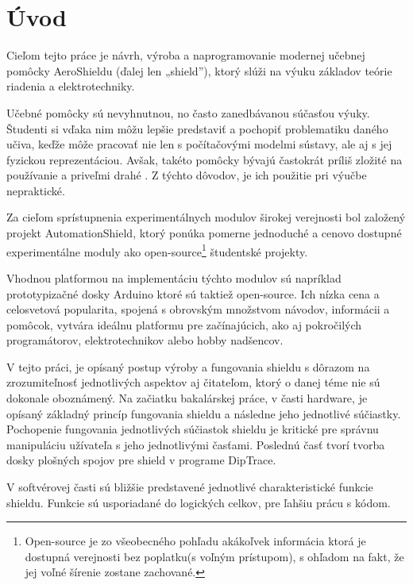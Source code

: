 \chapter*{Úvod}
\label{UVOD}



Cieľom tejto práce je návrh, výroba a naprogramovanie modernej učebnej pomôcky AeroShieldu (ďalej len „shield”), ktorý slúži na výuku základov teórie riadenia a elektrotechniky.

Učebné pomôcky sú nevyhnutnou, no často zanedbávanou súčasťou výuky. Študenti si vďaka nim môžu lepšie predstaviť a pochopiť problematiku daného učiva, keďže môže pracovať nie len s počítačovými modelmi sústavy, ale aj s jej fyzickou reprezentáciou. 
Avšak, takéto pomôcky bývajú častokrát príliš zložité na používanie a priveľmi drahé \cite{Hor}. Z týchto dôvodov, je ich použitie pri výučbe nepraktické.

Za cieľom sprístupnenia experimentálnych modulov širokej verejnosti bol založený projekt AutomationShield, ktorý ponúka pomerne jednoduché a cenovo dostupné experimentálne moduly ako open-source\footnote[1]{Open-source je zo všeobecného pohľadu akákoľvek informácia ktorá je dostupná verejnosti bez poplatku(s voľným prístupom), s ohľadom na fakt, že jej voľné šírenie zostane zachované.} študentské projekty.

Vhodnou platformou na implementáciu týchto modulov sú napríklad prototypizačné dosky Arduino ktoré sú taktiež open-source. Ich nízka cena a celosvetová popularita, spojená s obrovským množstvom návodov, informácii a pomôcok, vytvára ideálnu platformu pre začínajúcich, ako aj pokročilých programátorov, elektrotechnikov alebo hobby nadšencov.

V tejto práci, je opísaný postup výroby a fungovania shieldu s dôrazom na zrozumiteľnosť jednotlivých aspektov aj čitateľom, ktorý o danej téme nie sú dokonale oboznámený. Na začiatku bakalárskej práce, v časti hardware, je opísaný základný princíp fungovania shieldu a následne jeho jednotlivé súčiastky. Pochopenie fungovania jednotlivých súčiastok shieldu je kritické pre správnu manipuláciu užívateľa s jeho jednotlivými časťami. Poslednú časť tvorí tvorba dosky plošných spojov pre shield v programe DipTrace.

V softvérovej časti sú bližšie predstavené jednotlivé charakteristické funkcie shieldu. Funkcie sú usporiadané do logických celkov, pre ľahšiu prácu s kódom.

